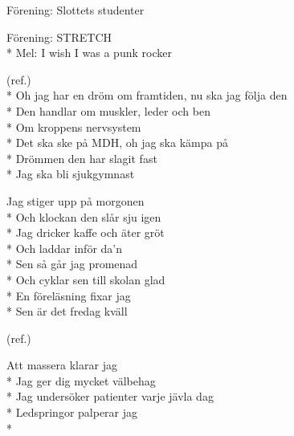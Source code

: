 \begin{SongText}[???]
    \begin{SongInfo}
        Förening: Slottets studenter
    \end{SongInfo}
    \begin{Verse}
        [NO SONG]
    \end{Verse}
\end{SongText}

\begin{SongText}[Sjukgymnastlåten]
    \begin{SongInfo}
        Förening: STRETCH\\*%
        Mel:  I wish I was a punk rocker
    \end{SongInfo}
    \begin{Verse}
        (ref.)\\*%
        Oh jag har en dröm om framtiden, nu ska jag följa den\\*%
        Den handlar om muskler, leder och ben\\*%
        Om kroppens nervsystem\\*%
        Det ska ske på MDH, oh jag ska kämpa på\\*%
        Drömmen den har slagit fast\\*%
        Jag ska bli sjukgymnast
    \end{Verse}
    \begin{Verse}
        Jag stiger upp på morgonen\\*%
        Och klockan den slår sju igen\\*%
        Jag dricker kaffe och äter gröt\\*%
        Och laddar inför da’n\\*%
        Sen så går jag promenad\\*%
        Och cyklar sen till skolan glad\\*%
        En föreläsning fixar jag\\*%
        Sen är det fredag kväll
    \end{Verse}
    \begin{Verse}
        (ref.)
    \end{Verse}
    \begin{Verse}
        Att massera klarar jag\\*%
        Jag ger dig mycket välbehag\\*%
        Jag undersöker patienter varje jävla dag\\*%
        Ledspringor palperar jag\\*%

\end{Verse}
\end{SongText}
